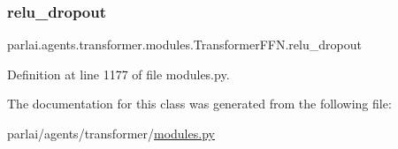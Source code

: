 \subsubsection{\texorpdfstring{relu\+\_\+dropout}{relu\_dropout}}
{\footnotesize\ttfamily parlai.\+agents.\+transformer.\+modules.\+Transformer\+F\+F\+N.\+relu\+\_\+dropout}



Definition at line 1177 of file modules.\+py.



The documentation for this class was generated from the following file\+:\begin{DoxyCompactItemize}
\item 
parlai/agents/transformer/\hyperlink{parlai_2agents_2transformer_2modules_8py}{modules.\+py}\end{DoxyCompactItemize}
